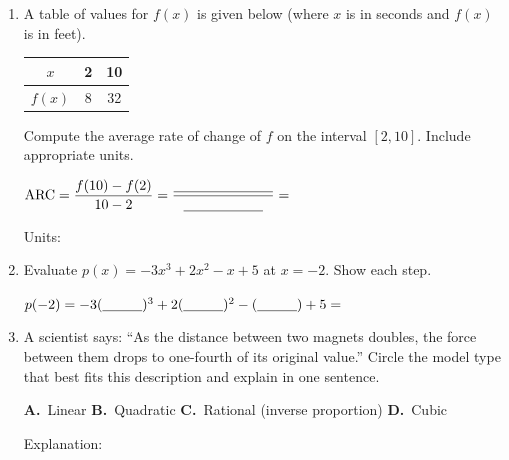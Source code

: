 \documentclass[10pt]{article}
\begin{document}
\namedateperiod

\vspace{0.12in}

\begin{enumerate}[itemsep=18pt]

\item A table of values for $f(x)$ is given below (where $x$ is in seconds and $f(x)$ is in feet).

      \smallskip
      \renewcommand{\arraystretch}{1.3}
      \begin{tabular}{|c|c|c|}
      \hline
      $x$ & 2 & 10 \\
      \hline
      $f(x)$ & 8 & 32 \\
      \hline
      \end{tabular}
      \smallskip

      Compute the average rate of change of $f$ on the interval $[2, 10]$.
      Include appropriate units.

      \vspace{0.08in}
      $\text{ARC} = \dfrac{f(10) - f(2)}{10 - 2} = \dfrac{\blank{2.5cm}}{\blank{2cm}} = $ \blank{2.5cm}

      \vspace{0.04in}
      Units: \blank{4cm}

\item Evaluate $p(x) = -3x^3 + 2x^2 - x + 5$ at $x = -2$. Show each step.

      \vspace{0.08in}
      $p(-2) = -3(\blank{1cm})^3 + 2(\blank{1cm})^2 - (\blank{1cm}) + 5 = $ \blank{3cm}

\item A scientist says: ``As the distance between two magnets doubles, the force between them
      drops to one-fourth of its original value.'' Circle the model type that best fits
      this description and explain in one sentence.

      \medskip
      \textbf{A.}~Linear \qquad \textbf{B.}~Quadratic \qquad \textbf{C.}~Rational (inverse proportion) \qquad \textbf{D.}~Cubic

      \vspace{0.08in}
      Explanation: \writeline

\end{enumerate}
\end{document}
